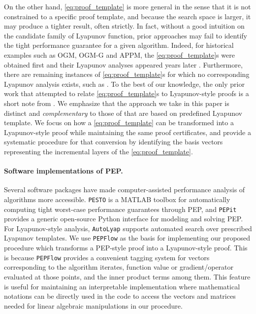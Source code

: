 \documentclass{article}
\theoremstyle{definition}
\theoremstyle{plain}
\newcommand{\fullpep}{PEP-style proof}
\begin{document}
On the other hand, \ref{eq:proof_template} is more general in the sense that it is not constrained to a specific proof template, and because the search space is larger, it may produce a tighter result, often strictly.
In fact, without a good intuition on the candidate family of Lyapunov function, prior approaches may fail to identify the tight performance guarantee for a given algorithm.
Indeed, for historical examples such as OGM, OGM-G and APPM, 
the \ref{eq:proof_template}s were obtained first and their Lyapunov analyses appeared years later \citep{dAspremontScieurTaylor2021_acceleration,LeeParkRyu2021_geometric, ParkParkRyu2023_factorsqrt2,RyuYin2022_largescale}. 
Furthermore, there are remaining instances of \ref{eq:proof_template}s for which no corresponding Lyapunov analysis exists, such as \cite{guTightSublinearConvergence2020, dragomirOptimalComplexityCertification2022, GuYang2025_tight, altschulerAccelerationStepsizeHedging2025, GrimmerShuWang2025_composing,  YoonRyuGrimmerInvariance2025}. 
To the best of our knowledge, the only prior work that attempted to relate \ref{eq:proof_template}s to Lyapunov-style proofs is a short note from \cite[Section~6]{goujaudFundamentalProofStructures2023}.
We emphasize that the approach we take in this paper is distinct and \textit{complementary} to those of \citep{TaylorVanScoyLessard2018_lyapunov, TaylorBach2019_stochastic, UpadhyayaBanertTaylorGiselsson2025_automated, UpadhyayaGuptaTaylorBanertGiselsson2026_autolyap} that are based on predefined Lyapunov template.
We focus on how a \ref{eq:proof_template} can be transformed into a Lyapunov-style proof while maintaining the same proof certificates, and provide a systematic procedure for that conversion by identifying the basis vectors representing the incremental layers of the \ref{eq:proof_template}.

\paragraph{Software implementations of PEP.}

Several software packages have made computer-assisted performance analysis of algorithms more
accessible.
\texttt{PESTO} \citep{TaylorHendrickxGlineur2017_performance} is a MATLAB
toolbox for automatically computing tight worst-case performance guarantees
through PEP, and \texttt{PEPit} \citep{pepit2024} provides a generic open-source
Python interface for modeling and solving PEP.
For Lyapunov-style analysis, \texttt{AutoLyap}
\citep{UpadhyayaGuptaTaylorBanertGiselsson2026_autolyap} supports automated
search over prescribed Lyapunov templates.
We use \texttt{PEPFlow} \citep{SuhYingJiangNguyen2025_pepflow} as the 
basis for implementing our proposed procedure which transforms a 
\fullpep{} into a Lyapunov-style proof.
This is because \texttt{PEPFlow} provides a convenient tagging system for vectors corresponding to the algorithm iterates, function value or gradient/operator evaluated at those points, and the inner product terms among them.
This feature is useful for maintaining an interpretable implementation where mathematical notations can be directly used in the code to access the vectors and matrices needed for linear algebraic manipulations in our procedure.
\end{document}

